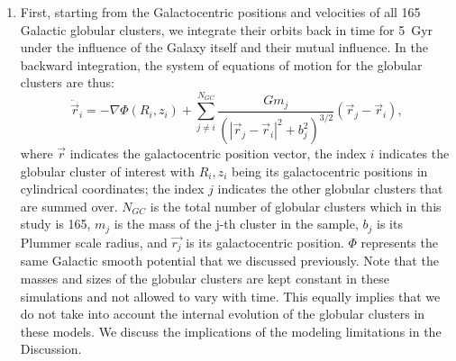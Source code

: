 \documentclass{aa}
\begin{document}
      \begin{enumerate}
          \item First, starting from the Galactocentric positions and velocities of all 165 Galactic globular clusters, we integrate their orbits back in time for 5~Gyr under the influence of the Galaxy itself and their mutual influence. In the backward integration, the system of equations of motion for the globular clusters are thus: 
          \begin{equation}
          \ddot{\vec{r}}_i = -\nabla \Phi(R_i,z_i) + \left.\sum_{j\neq i}^{N_{GC}} \frac{Gm_j}{\left(|\vec{r}_j - \vec{r}_i|^2 + b_j^2\right)^{3/2}}\right. \left(\vec{r}_j - \vec{r}_i\right),
          \end{equation}\label{eq:GCNBody} 
          \noindent where $\vec{r}$ indicates the galactocentric position vector, the index $i$ indicates the globular cluster of interest with $R_i,z_i$ being its galactocentric positions in cylindrical coordinates; the index $j$ indicates the other globular clusters that are summed over. $N_{GC}$ is the total number of globular clusters which in this study is 165, $m_j$ is the mass of the j-th cluster in the sample, $b_j$ is its Plummer scale radius, and $\vec{r_j}$ is its galactocentric position. $\Phi$ represents the same Galactic smooth potential that we discussed previously\citep[][Model~II, in the present case]{2017A&A...598A..66P}. Note that the masses and sizes of the globular clusters are kept constant in these simulations and not allowed to vary with time. This equally implies that we do not take into account the internal evolution of the globular clusters in these models. We discuss the implications of the modeling limitations in the Discussion.
      

\end{enumerate}
\end{document}
